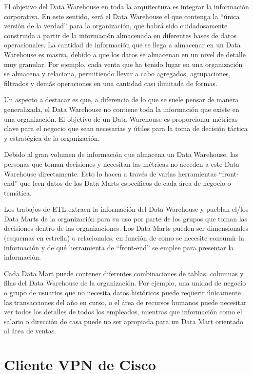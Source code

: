 \documentclass[a4paper, 12pt]{book}
\begin{document}
El objetivo del Data Warehouse en toda la arquitectura es integrar la información corporativa. En este sentido, será el Data Warehouse el que contenga la “única versión de la verdad” para la organización, que habrá sido cuidadosamente construida a partir de la información almacenada en diferentes bases de datos operacionales. La cantidad de información que se llega a almacenar en un Data Warehouse es masiva, debido a que los datos se almacenan en un nivel de detalle muy granular. Por ejemplo, cada venta que ha tenido lugar en una organización se almacena y relaciona, permitiendo llevar a cabo agregados, agrupaciones, filtrados y demás operaciones en una cantidad casi ilimitada de formas.

Un aspecto a destacar es que, a diferencia de lo que se suele pensar de manera generalizada, el Data Warehouse no contiene toda la información que existe en una organización. El objetivo de un Data Warehouse es proporcionar métricas clave para el negocio que sean necesarias y útiles para la toma de decisión táctica y estratégica de la organización.

Debido al gran volumen de información que almacena un Data Warehouse, las personas que toman decisiones y necesitan las métricas no acceden a este Data Warehouse directamente. Esto lo hacen a través de varias herramientas “front-end” que leen datos de los Data Marts específicos de cada área de negocio o temática.

Los trabajos de ETL extraen la información del Data Warehouse y pueblan el/los Data Marts de la organización para su uso por parte de los grupos que toman las decisiones dentro de las organizaciones. Los Data Marts pueden ser dimensionales (esquemas en estrella) o relacionales, en función de como se necesite consumir la información y de qué herramienta de “front-end” se emplee para presentar la información.

Cada Data Mart puede contener diferentes combinaciones de tablas, columnas y filas del Data Warehouse de la organización. Por ejemplo, una unidad de negocio o grupo de usuarios que no necesita datos históricos puede requerir únicamente las transacciones del año en curso, o el área de recursos humanos puede necesitar ver todos los detalles de todos los empleados, mientras que información como el salario o dirección de casa puede no ser apropiada para un Data Mart orientado al área de ventas.

\section{Cliente VPN de Cisco}
\label{sec:Cisco_VPN}
\end{document}
